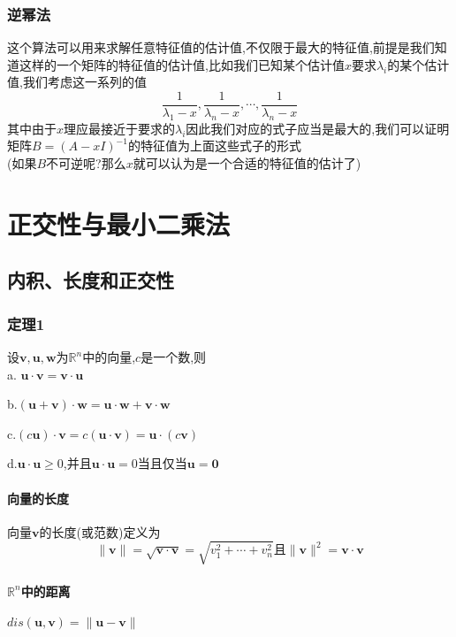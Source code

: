 \documentclass{article}
\newcommand{\RR}{\mathbb{R}}
\newcommand{\ve}{\boldsymbol}
\begin{document}
\begin{CJK}{UTF8}{gkai}
\subsubsection{逆幂法}
这个算法可以用来求解任意特征值的估计值,不仅限于最大的特征值,前提是我们知道这样的一个矩阵的特征值的估计值,比如我们已知某个估计值$x$要求$\lambda_i$的某个估计值,我们考虑这一系列的值
\[\dfrac{1}{\lambda_1 - x },\dfrac{1}{\lambda_n - x },\cdots,\dfrac{1}{\lambda_n - x }\]
其中由于$x$理应最接近于要求的$\lambda_i$因此我们对应的式子应当是最大的,我们可以证明矩阵$B = (A - xI)^{-1}$的特征值为上面这些式子的形式\\

(如果$B$不可逆呢?那么$x$就可以认为是一个合适的特征值的估计了)

\newpage
\section{正交性与最小二乘法}
\subsection{内积、长度和正交性}
\subsubsection{定理1}
设$\ve{v},\ve{u},\ve{w}$为$\RR^n$中的向量,$c$是一个数,则\\

a. $\ve{u} \cdot \ve{v} = \ve{v} \cdot \ve{u}$

b.$(\ve{u} + \ve{v})\cdot \ve{w} = \ve{u} \cdot \ve{w} + \ve{v} \cdot \ve{w}$

c.$(c\ve{u}) \cdot \ve{v} = c(\ve{u} \cdot \ve{v}) = \ve{u} \cdot (c\ve{v})$

d.$\ve{u} \cdot \ve{u} \geq 0$,并且$\ve{u} \cdot \ve{u} = 0$当且仅当$\ve{u} = \ve{0}$\\
\paragraph{向量的长度\\}

向量$\ve{v}$的长度(或范数)定义为
\[ \|\ve{v}\| = \sqrt{\ve{v}\cdot \ve{v}} = \sqrt{v_1^2 + \cdots + v_n^2} \text{且} \|\ve{v}\|^2 = \ve{v}\cdot \ve{v} \]

\paragraph{$\RR^n$中的距离} $dis(\ve{u} , \ve{v}) = \|\ve{u} - \ve{v} \|$\\


\end{CJK}
\end{document}
